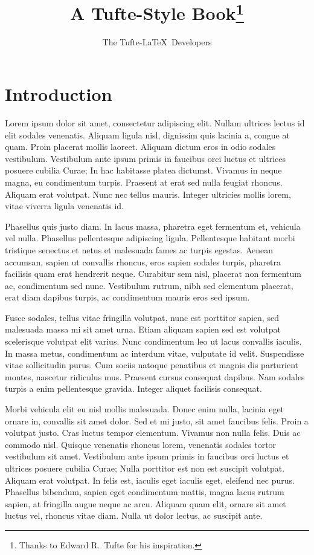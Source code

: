 \documentclass{scrbook}
\title{A Tufte-Style Book\thanks{Thanks to Edward R.~Tufte for his inspiration.}}
\author{The Tufte-LaTeX\ Developers}
\begin{document}
\maketitle

\tableofcontents

\listoffigures

\listoftables


\chapter{Introduction}

Lorem ipsum dolor sit amet, consectetur adipiscing elit. Nullam ultrices lectus id elit sodales venenatis. Aliquam ligula nisl, dignissim quis lacinia a, congue at quam. Proin placerat mollis laoreet. Aliquam dictum eros in odio sodales vestibulum. Vestibulum ante ipsum primis in faucibus orci luctus et ultrices posuere cubilia Curae; In hac habitasse platea dictumst. Vivamus in neque magna, eu condimentum turpis. Praesent at erat sed nulla feugiat rhoncus. Aliquam erat volutpat. Nunc nec tellus mauris. Integer ultricies mollis lorem, vitae viverra ligula venenatis id.

Phasellus quis justo diam. In lacus massa, pharetra eget fermentum et, vehicula vel nulla. Phasellus pellentesque adipiscing ligula. Pellentesque habitant morbi tristique senectus et netus et malesuada fames ac turpis egestas. Aenean accumsan, sapien ut convallis rhoncus, eros sapien sodales turpis, pharetra facilisis quam erat hendrerit neque. Curabitur sem nisl, placerat non fermentum ac, condimentum sed nunc. Vestibulum rutrum, nibh sed elementum placerat, erat diam dapibus turpis, ac condimentum mauris eros sed ipsum.

Fusce sodales, tellus vitae fringilla volutpat, nunc est porttitor sapien, sed malesuada massa mi sit amet urna. Etiam aliquam sapien sed est volutpat scelerisque volutpat elit varius. Nunc condimentum leo ut lacus convallis iaculis. In massa metus, condimentum ac interdum vitae, vulputate id velit. Suspendisse vitae sollicitudin purus. Cum sociis natoque penatibus et magnis dis parturient montes, nascetur ridiculus mus. Praesent cursus consequat dapibus. Nam sodales turpis a enim pellentesque gravida. Integer aliquet facilisis consequat.

Morbi vehicula elit eu nisl mollis malesuada. Donec enim nulla, lacinia eget ornare in, convallis sit amet dolor. Sed et mi justo, sit amet faucibus felis. Proin a volutpat justo. Cras luctus tempor elementum. Vivamus non nulla felis. Duis ac commodo nisl. Quisque venenatis rhoncus lorem, venenatis sodales tortor vestibulum sit amet. Vestibulum ante ipsum primis in faucibus orci luctus et ultrices posuere cubilia Curae; Nulla porttitor est non est suscipit volutpat. Aliquam erat volutpat. In felis est, iaculis eget iaculis eget, eleifend nec purus. Phasellus bibendum, sapien eget condimentum mattis, magna lacus rutrum sapien, at fringilla augue neque ac arcu. Aliquam quam elit, ornare sit amet luctus vel, rhoncus vitae diam. Nulla ut dolor lectus, ac suscipit ante.
\end{document}
